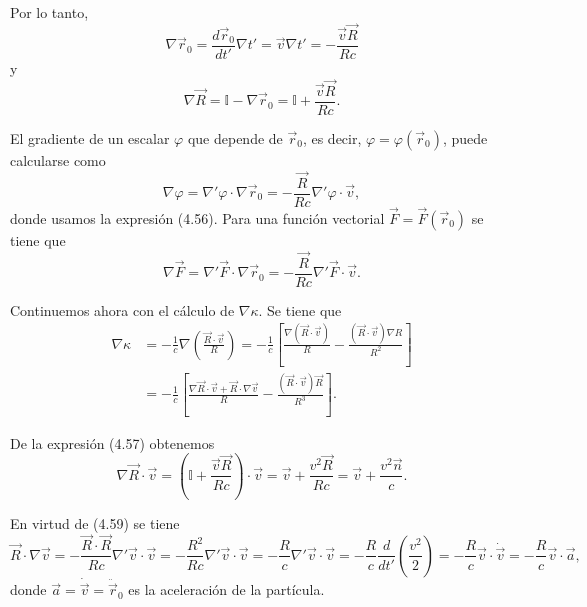 \documentclass[12pt,a4paper]{book}
\begin{document}
Por lo tanto,
\begin{equation}
\nabla\vec{r}_0 = \frac{d\vec{r}_0}{dt'}\nabla t' = \vec{v}\nabla t' = -\frac{\vec{v}\vec{R}}{Rc}
\end{equation}
y
\begin{equation}
\nabla\vec{R} = \mathbb{I} - \nabla\vec{r}_0 = \mathbb{I} + \frac{\vec{v}\vec{R}}{Rc}.
\end{equation}

El gradiente de un escalar $\varphi$ que depende de $\vec{r}_0$, es decir, $\varphi = \varphi(\vec{r}_0)$, puede calcularse como
\begin{equation}
\nabla\varphi = \nabla'\varphi \cdot \nabla\vec{r}_0 = -\frac{\vec{R}}{Rc}\nabla'\varphi \cdot \vec{v},
\end{equation}
donde usamos la expresión (4.56). Para una función vectorial $\vec{F} = \vec{F}(\vec{r}_0)$ se tiene que
\begin{equation}
\nabla\vec{F} = \nabla'\vec{F} \cdot \nabla\vec{r}_0 = -\frac{\vec{R}}{Rc}\nabla'\vec{F} \cdot \vec{v}.
\end{equation}

Continuemos ahora con el cálculo de $\nabla\kappa$. Se tiene que
\begin{align}
\nabla\kappa &= -\frac{1}{c}\nabla\left(\frac{\vec{R} \cdot \vec{v}}{R}\right) = -\frac{1}{c}\left[\frac{\nabla(\vec{R} \cdot \vec{v})}{R} - \frac{(\vec{R} \cdot \vec{v})\nabla R}{R^2}\right] \nonumber \\
&= -\frac{1}{c}\left[\frac{\nabla\vec{R} \cdot \vec{v} + \vec{R} \cdot \nabla\vec{v}}{R} - \frac{(\vec{R} \cdot \vec{v})\vec{R}}{R^3}\right].
\end{align}

De la expresión (4.57) obtenemos
\begin{equation}
\nabla\vec{R} \cdot \vec{v} = \left(\mathbb{I} + \frac{\vec{v}\vec{R}}{Rc}\right) \cdot \vec{v} = \vec{v} + \frac{v^2\vec{R}}{Rc} = \vec{v} + \frac{v^2\vec{n}}{c}.
\end{equation}

En virtud de (4.59) se tiene
\begin{equation}
\vec{R} \cdot \nabla\vec{v} = -\frac{\vec{R} \cdot \vec{R}}{Rc}\nabla'\vec{v} \cdot \vec{v} = -\frac{R^2}{Rc}\nabla'\vec{v} \cdot \vec{v} = -\frac{R}{c}\nabla'\vec{v} \cdot \vec{v} = -\frac{R}{c}\frac{d}{dt'}\left(\frac{v^2}{2}\right) = -\frac{R}{c}\vec{v} \cdot \dot{\vec{v}} = -\frac{R}{c}\vec{v} \cdot \vec{a},
\end{equation}
donde $\vec{a} = \dot{\vec{v}} = \ddot{\vec{r}}_0$ es la aceleración de la partícula.
\end{document}
